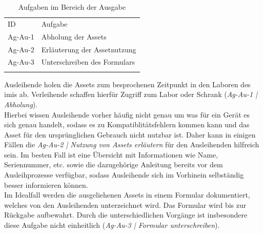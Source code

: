 \begin{table}[h]
        \centering
        \caption{Aufgaben im Bereich der Ausgabe}
        \begin{tabular}{ll}
                \arrayrulecolor{maincolor}\hline
                \sffamily\color{maincolor}ID & \sffamily\color{maincolor}Aufgabe
                \\
                \arrayrulecolor{maincolor}\hline
                Ag-Au-1                      & Abholung der Assets
                \\
                Ag-Au-2                      & Erläuterung der Assetnutzung
                \\
                Ag-Au-3                      & Unterschreiben des Formulars
                \\
                \arrayrulecolor{maincolor}\hline
        \end{tabular}
        \label{table:Ag-Au}
\end{table}

Ausleihende holen die Assets zum besprochenen Zeitpunkt in den Laboren des
\ac{imis} ab. Verleihende schaffen hierfür Zugriff zum Labor oder Schrank
(\textit{Ag-Au-1 | Abholung}). \\
Hierbei wissen Ausleihende vorher häufig nicht genau um was für ein Gerät es sich genau
handelt, sodass es zu Kompatiblitätsfehlern kommen kann und das Asset für den
ursprünglichen Gebrauch nicht nutzbar ist. Daher kann in einigen Fällen die
\textit{Ag-Au-2 | Nutzung von Assets erläutern} für den Ausleihenden hilfreich
sein. Im besten Fall ist eine Übersicht mit Informationen wie Name,
Seriennummer, etc. sowie die dazugehörige Anleitung bereits vor dem
Ausleihprozesse verfügbar, sodass Ausleihende sich im Vorhinein selbständig
besser informieren können.\\
Im Idealfall werden die ausgeliehenen Assets in einem Formular dokumentiert,
welches von den Ausleihenden unterzeichnet wird. Das Formular wird bis zur
Rückgabe aufbewahrt. Durch die unterschiedlichen Vorgänge ist insbesondere diese
Aufgabe nicht einheitlich (\textit{Ag-Au-3 | Formular unterschreiben}).

